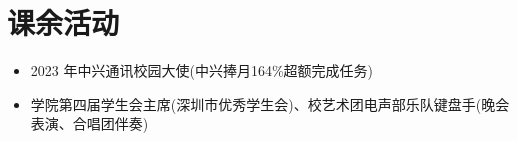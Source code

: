 
\section{课余活动}
\begin{itemize}[parsep=0.2ex]
  \item 2023 年中兴通讯校园大使(中兴捧月164\%超额完成任务)
  \item 学院第四届学生会主席(深圳市优秀学生会)、校艺术团电声部乐队键盘手(晚会表演、合唱团伴奏)
\end{itemize}
